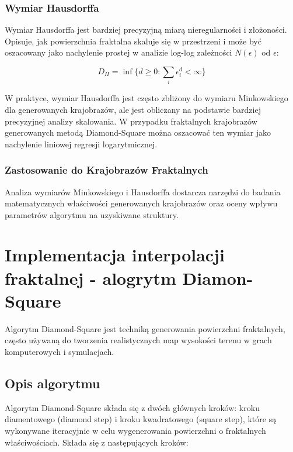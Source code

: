\documentclass{article}
\begin{document}
\subsubsection*{Wymiar Hausdorffa}

Wymiar Hausdorffa jest bardziej precyzyjną miarą nieregularności i złożoności. Opisuje, jak powierzchnia fraktalna skaluje się w przestrzeni i może być oszacowany jako nachylenie prostej w analizie log-log zależności \(N(\epsilon)\) od \(\epsilon\):

\[
D_H = \inf \{d \geq 0 : \sum_i \epsilon_i^d < \infty\}
\]

W praktyce, wymiar Hausdorffa jest często zbliżony do wymiaru Minkowskiego dla generowanych krajobrazów, ale jest obliczany na podstawie bardziej precyzyjnej analizy skalowania. W przypadku fraktalnych krajobrazów generowanych metodą Diamond-Square można oszacować ten wymiar jako nachylenie liniowej regresji logarytmicznej.

\subsubsection*{Zastosowanie do Krajobrazów Fraktalnych}

Analiza wymiarów Minkowskiego i Hausdorffa dostarcza narzędzi do badania matematycznych właściwości generowanych krajobrazów oraz oceny wpływu parametrów algorytmu na uzyskiwane struktury.

\newpage
\section{Implementacja interpolacji fraktalnej - alogrytm Diamon-Square}

Algorytm Diamond-Square jest techniką generowania powierzchni fraktalnych, często używaną do tworzenia realistycznych map wysokości terenu w grach komputerowych i symulacjach.

\subsection{Opis algorytmu}

Algorytm Diamond-Square składa się z dwóch głównych kroków: kroku diamentowego (diamond step) i kroku kwadratowego (square step), które są wykonywane iteracyjnie w celu wygenerowania powierzchni o fraktalnych właściwościach. Składa się z następujących kroków:
\end{document}
